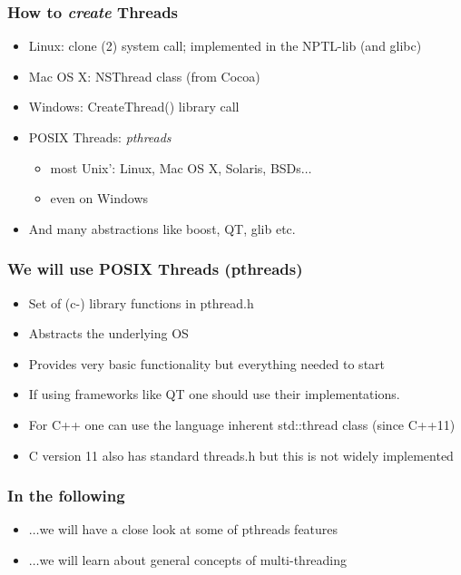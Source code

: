 \documentclass[10pt]{beamer}
\begin{document}
\begin{frame}
        \frametitle{How to \emph{create} Threads}
        \begin{itemize}
                \item Linux: clone (2) system call; implemented in the NPTL-lib (and glibc)
                \item Mac OS X: NSThread class (from Cocoa)
                \item Windows: CreateThread() library call
                \item POSIX Threads: \emph{pthreads}
                \begin{itemize}
                        \item most Unix': Linux, Mac OS X, Solaris, BSDs$\ldots$ 
                        \item even on Windows
                \end{itemize}
                \item And many abstractions like boost, QT, glib etc.
        \end{itemize}
\end{frame}

\begin{frame}
        \frametitle{We will use POSIX Threads (pthreads)}
        \begin{itemize}
                \item Set of (c-) library functions in pthread.h
                \item Abstracts the underlying OS
                \item Provides very basic functionality but everything needed to start 
                \item If using frameworks like QT one should use their implementations.
                \item For C++ one can use the language inherent std::thread class (since C++11)
                \item C version 11 also has standard threads.h but this is not widely implemented  
        \end{itemize}
\end{frame}

\begin{frame}
        \frametitle{In the following}
        \begin{itemize}
                \item $\ldots$we will have a close look at some of pthreads features
                \item $\ldots$we will learn about general concepts of multi-threading
        \end{itemize}
\end{frame}
\end{document}
